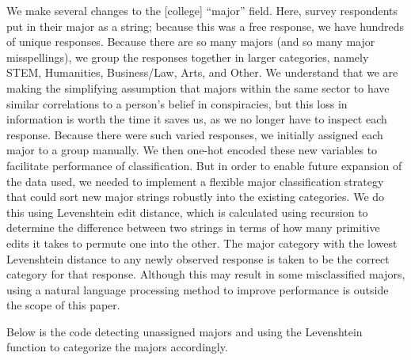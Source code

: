 \documentclass[11pt]{article}
\begin{document}
We make several changes to the [college] ``major'' field.
Here, survey respondents put in their major as a string; because
this was a free response, we have hundreds of unique responses.
Because there are so many majors (and so many major misspellings), we
group the responses together in larger categories, namely
STEM, Humanities, Business/Law, Arts, and Other.
We understand that we are making the simplifying assumption that majors within the same
sector to have similar correlations to a person's belief in
conspiracies, but this loss in information is worth the time it saves us, as we no longer have to inspect each response. Because there were such varied responses, we initially
assigned each major to a group manually. We then one-hot encoded these
new variables to facilitate performance of classification. But in order to
enable future expansion of the data used, we needed to implement a flexible
major classification strategy that could sort new major strings robustly
into the existing categories. We do this using Levenshtein edit
distance, which is
calculated using recursion to determine the
difference between two strings in terms of how many primitive edits it
takes to permute one into the other. The major category with the lowest Levenshtein distance to any newly observed response is taken to be the correct category for that response. Although this may result in some misclassified majors, using a natural language processing method to improve performance is outside the scope of this paper.

Below is the code detecting unassigned majors and using the Levenshtein
function to categorize the majors accordingly.
\end{document}

